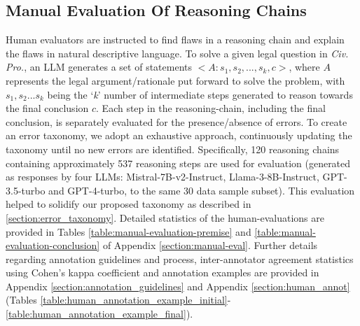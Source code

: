 \subsection{Manual Evaluation Of Reasoning Chains}
\label{section:manual-eval-sec}
Human evaluators are instructed to find flaws in a reasoning chain and explain the flaws in natural descriptive language. To solve a given legal question in \textit{Civ. Pro.}, an LLM generates a set of statements $<$$A: s_1, s_2, ..., s_k, c$$>$, where $A$ represents the legal argument/rationale put forward to solve the problem, with $s_1, s_2...s_k$ being the `\textit{k}' number of intermediate steps generated to reason towards the final conclusion $c$. Each step in the reasoning-chain, including the final conclusion, is separately evaluated for the presence/absence of errors. To create an error taxonomy, we adopt an exhaustive approach, continuously updating the taxonomy until no new errors are identified. Specifically, 120 reasoning chains containing approximately 537 reasoning steps are used for evaluation (generated as responses by four LLMs: Mistral-7B-v2-Instruct, Llama-3-8B-Instruct, GPT-3.5-turbo and GPT-4-turbo, to the same 30 data sample subset). This evaluation helped to solidify our proposed taxonomy as described in \textsection \ref{section:error_taxonomy}. Detailed statistics of the human-evaluations are provided in Tables \ref{table:manual-evaluation-premise} and \ref{table:manual-evaluation-conclusion} of Appendix \ref{section:manual-eval}. Further details regarding annotation guidelines and process, inter-annotator agreement statistics using Cohen's kappa coefficient \citep{cohen1960kappa} and annotation examples are provided in Appendix \ref{section:annotation_guidelines} and Appendix \ref{section:human_annot} (Tables \ref{table:human_annotation_example_initial}-\ref{table:human_annotation_example_final}).



